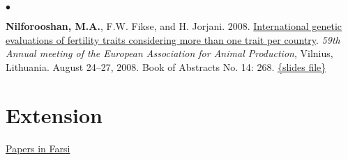 \documentclass[margin,line]{res}
\newenvironment{list2}{
  \begin{list}{$\bullet$}{%
      \setlength{\itemsep}{0in}
      \setlength{\parsep}{0in} \setlength{\parskip}{0in}
      \setlength{\topsep}{0in} \setlength{\partopsep}{0in}
      \setlength{\leftmargin}{0.2in}}}{\end{list}}
\begin{document}
\begin{resume}
\begin{list2}
\item {\bf Nilforooshan, M.A.}, F.W. Fikse, and H. Jorjani. 2008. \href{https://www.researchgate.net/publication/358219159_International_genetic_evaluations_of_fertility_traits_considering_more_than_one_trait_per_country}{International genetic evaluations of fertility traits considering more than one trait per country}. {\em 59th Annual meeting of the European Association for Animal Production}, Vilnius, Lithuania. August 24--27, 2008. Book of Abstracts No. 14: 268. \href{https://drive.google.com/file/d/0B2l_izQwJmVpd2pieXNtWTQxMkE/view?usp=sharing&resourcekey=0-Q2h6mMWM8Aw-Tsi787os4g}{\{slides file\}}
\end{list2}
\section{\sc Extension}

\href{https://nilforooshan.github.io/resume/extension}{Papers in Farsi}

\end{resume}
\end{document}
